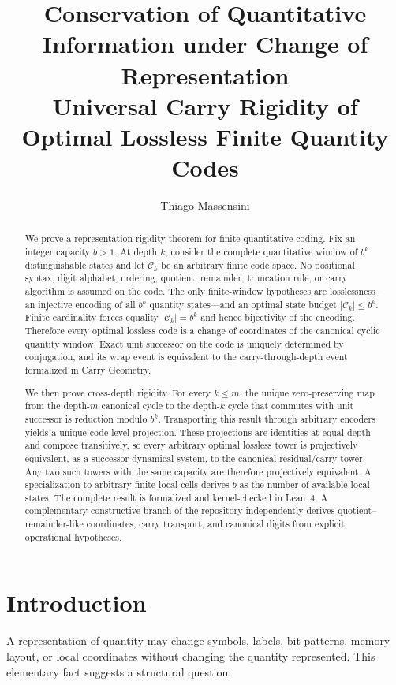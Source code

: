 \documentclass[11pt]{article}
\title{Conservation of Quantitative Information under Change of Representation\\[0.5ex]
\large Universal Carry Rigidity of Optimal Lossless Finite Quantity Codes}
\author{Thiago Massensini}
\date{}
\theoremstyle{definition}
\newcommand{\card}[1]{\left|#1\right|}
\newcommand{\Code}{\mathcal{C}}
\begin{document}
\maketitle

\begin{abstract}
We prove a representation-rigidity theorem for finite quantitative coding. Fix an integer capacity $b>1$. At depth $k$, consider the complete quantitative window of $b^k$ distinguishable states and let $\Code_k$ be an arbitrary finite code space. No positional syntax, digit alphabet, ordering, quotient, remainder, truncation rule, or carry algorithm is assumed on the code. The only finite-window hypotheses are losslessness---an injective encoding of all $b^k$ quantity states---and an optimal state budget $\card{\Code_k}\le b^k$. Finite cardinality forces equality $\card{\Code_k}=b^k$ and hence bijectivity of the encoding. Therefore every optimal lossless code is a change of coordinates of the canonical cyclic quantity window. Exact unit successor on the code is uniquely determined by conjugation, and its wrap event is equivalent to the carry-through-depth event formalized in Carry Geometry.

We then prove cross-depth rigidity. For every $k\le m$, the unique zero-preserving map from the depth-$m$ canonical cycle to the depth-$k$ cycle that commutes with unit successor is reduction modulo $b^k$. Transporting this result through arbitrary encoders yields a unique code-level projection. These projections are identities at equal depth and compose transitively, so every arbitrary optimal lossless tower is projectively equivalent, as a successor dynamical system, to the canonical residual/carry tower. Any two such towers with the same capacity are therefore projectively equivalent. A specialization to arbitrary finite local cells derives $b$ as the number of available local states. The complete result is formalized and kernel-checked in Lean~4. A complementary constructive branch of the repository independently derives quotient--remainder-like coordinates, carry transport, and canonical digits from explicit operational hypotheses.
\end{abstract}

\section{Introduction}

A representation of quantity may change symbols, labels, bit patterns, memory layout, or local coordinates without changing the quantity represented. This elementary fact suggests a structural question:
\end{document}
